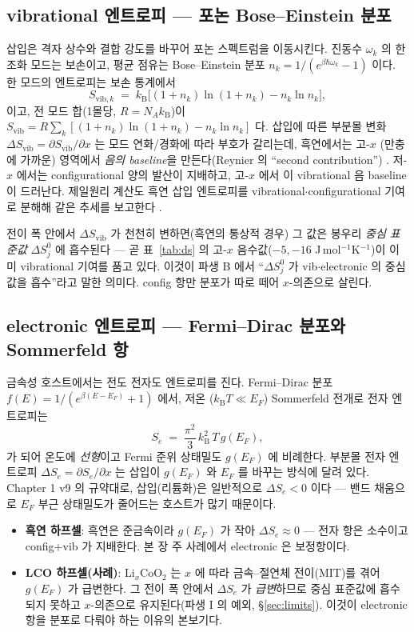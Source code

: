 \documentclass[11pt,a4paper]{article}
\newcommand{\vib}{\mathrm{vib}}
\newcommand{\kB}{k_{\mathrm B}}
\begin{document}
\subsection{vibrational 엔트로피 — 포논 Bose--Einstein 분포}
삽입은 격자 상수와 결합 강도를 바꾸어 포논 스펙트럼을 이동시킨다. 진동수 $\omega_k$ 의 한 조화 모드는 보손이고,
평균 점유는 Bose--Einstein 분포 $n_k=1/(e^{\beta\hbar\omega_k}-1)$ 이다. 한 모드의 엔트로피는 보손 통계에서
\begin{equation}
S_{\vib,k} \;=\; \kB\bigl[(1+n_k)\ln(1+n_k) - n_k\ln n_k\bigr],
\label{eq:Svib_mode}
\end{equation}
이고, 전 모드 합(1몰당, $R=N_A\kB$)이 $S_\vib=R\sum_k[(1+n_k)\ln(1+n_k)-n_k\ln n_k]$ 다. 삽입에 따른 부분몰
변화 $\Delta S_\vib=\partial S_\vib/\partial x$ 는 모드 연화/경화에 따라 부호가 갈리는데, 흑연에서는 고-$x$
(만충에 가까운) 영역에서 \emph{음의 baseline}을 만든다(Reynier 의 ``second contribution'') \cite{reynier2003}.
저-$x$ 에서는 configurational 양의 발산이 지배하고, 고-$x$ 에서 이 vibrational 음 baseline 이 드러난다. 제일원리
계산도 흑연 삽입 엔트로피를 vibrational$\cdot$configurational 기여로 분해해 같은 추세를 보고한다 \cite{jpcc2021}.

전이 폭 안에서 $\Delta S_\vib$ 가 천천히 변하면(흑연의 통상적 경우) 그 값은 봉우리 \emph{중심 표준값}
$\Delta S^0_j$ 에 흡수된다 — 곧 표~\ref{tab:ds} 의 고-$x$ 음수값($-5,-16$ J\,mol$^{-1}$K$^{-1}$)이 이미
vibrational 기여를 품고 있다. 이것이 파생 B 에서 ``$\Delta S^0_j$ 가 vib$\cdot$electronic 의 중심값을 흡수''라고
말한 의미다. config 항만 분포가 따로 떼어 $x$-의존으로 살린다.

\subsection{electronic 엔트로피 — Fermi--Dirac 분포와 Sommerfeld 항}\label{ssec:elec}
금속성 호스트에서는 전도 전자도 엔트로피를 진다. Fermi--Dirac 분포 $f(E)=1/(e^{\beta(E-E_F)}+1)$ 에서, 저온
($\kB T\ll E_F$) Sommerfeld 전개로 전자 엔트로피는
\begin{equation}
S_e \;=\; \frac{\pi^2}{3}\,\kB^2\,T\,g(E_F),
\label{eq:Se}
\end{equation}
가 되어 온도에 \emph{선형}이고 Fermi 준위 상태밀도 $g(E_F)$ 에 비례한다. 부분몰 전자 엔트로피
$\Delta S_e=\partial S_e/\partial x$ 는 삽입이 $g(E_F)$ 와 $E_F$ 를 바꾸는 방식에 달려 있다. Chapter 1 v9 의
규약대로, 삽입(리튬화)은 일반적으로 $\Delta S_e<0$ 이다 — 밴드 채움으로 $E_F$ 부근 상태밀도가 줄어드는 호스트가
많기 때문이다.
\begin{itemize}[leftmargin=1.4em,itemsep=1pt]
\item \textbf{흑연 하프셀}: 흑연은 준금속이라 $g(E_F)$ 가 작아 $\Delta S_e\approx0$ — 전자 항은 소수이고
config$+$vib 가 지배한다. 본 장 주 사례에서 electronic 은 보정항이다.
\item \textbf{LCO 하프셀(사례)}: Li$_x$CoO$_2$ 는 $x$ 에 따라 금속--절연체 전이(MIT)를 겪어 $g(E_F)$ 가
급변한다. 그 전이 폭 안에서 $\Delta S_e$ 가 \emph{급변}하므로 중심 표준값에 흡수되지 못하고 $x$-의존으로
유지된다(파생 I 의 예외, \S\ref{sec:limits}). 이것이 electronic 항을 분포로 다뤄야 하는 이유의 본보기다.
\end{itemize}
\end{document}
